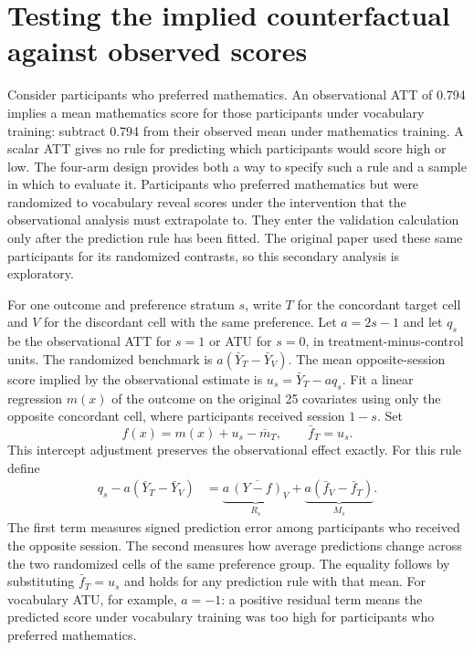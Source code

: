\section{Testing the implied counterfactual against observed scores}
\label{sec:validation}

Consider participants who preferred mathematics. An observational ATT of 0.794 implies a mean mathematics score for those participants under vocabulary training: subtract 0.794 from their observed mean under mathematics training. A scalar ATT gives no rule for predicting which participants would score high or low. The four-arm design provides both a way to specify such a rule and a sample in which to evaluate it. Participants who preferred mathematics but were randomized to vocabulary reveal scores under the intervention that the observational analysis must extrapolate to. They enter the validation calculation only after the prediction rule has been fitted. The original paper used these same participants for its randomized contrasts, so this secondary analysis is exploratory.

For one outcome and preference stratum $s$, write $T$ for the concordant target cell and $V$ for the discordant cell with the same preference. Let $a=2s-1$ and let $q_s$ be the observational ATT for $s=1$ or ATU for $s=0$, in treatment-minus-control units. The randomized benchmark is $a(\bar Y_T-\bar Y_V)$. The mean opposite-session score implied by the observational estimate is $u_s=\bar Y_T-aq_s$. Fit a linear regression $m(x)$ of the outcome on the original 25 covariates using only the opposite concordant cell, where participants received session $1-s$. Set
\[
 f(x)=m(x)+u_s-\bar m_T,\qquad \bar f_T=u_s .
\]
This intercept adjustment preserves the observational effect exactly. For this rule define
\begin{align}
 q_s-a(\bar Y_T-\bar Y_V)
 &= \underbrace{a\,\overline{(Y-f)}_V}_{R_s}
    +\underbrace{a(\bar f_V-\bar f_T)}_{M_s}.
 \label{eq:residual-audit}
\end{align}
The first term measures signed prediction error among participants who received the opposite session. The second measures how average predictions change across the two randomized cells of the same preference group. The equality follows by substituting $\bar f_T=u_s$ and holds for any prediction rule with that mean. For vocabulary ATU, for example, $a=-1$: a positive residual term means the predicted score under vocabulary training was too high for participants who preferred mathematics.

